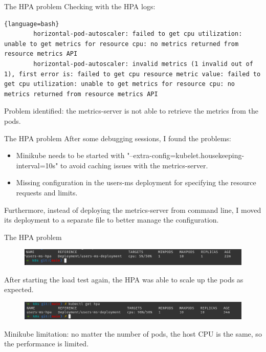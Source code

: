\documentclass{beamer}
\begin{document}
\begin{frame}[fragile]{The HPA problem}
Checking with the HPA logs:
	\begin{lstlisting}{language=bash}
		horizontal-pod-autoscaler: failed to get cpu utilization: unable to get metrics for resource cpu: no metrics returned from resource metrics API
		horizontal-pod-autoscaler: invalid metrics (1 invalid out of 1), first error is: failed to get cpu resource metric value: failed to get cpu utilization: unable to get metrics for resource cpu: no metrics returned from resource metrics API
	\end{lstlisting}

	\begin{block}{}
		Problem identified: the metrics-server is not able to retrieve the metrics from the pods.
	\end{block}
\end{frame}

\begin{frame}[fragile]{The HPA problem}
	After some debugging sessions, I found the problems:
	\begin{itemize}
		\item Minikube needs to be started with "--extra-config=kubelet.housekeeping-interval=10s" to avoid caching issues with the metrics-server.
		\item Missing configuration in the users-ms deployment for specifying the resource requests and limits.
	\end{itemize}

	Furthermore, instead of deploying the metrics-server from command line, I moved its deployment to a separate file to better manage the configuration.
\end{frame}

\begin{frame}[fragile]{The HPA problem}
	\begin{figure}
		\centering
		\includegraphics[width=1\linewidth]{./images/hpaFix1.png}
	\end{figure}
	After starting the load test again, the HPA was able to scale up the pods as expected.
	\begin{figure}
		\centering
		\includegraphics[width=1\linewidth]{./images/hpaFix3.png}
	\end{figure}
	Minikube limitation: no matter the number of pods, the host CPU is the same, so the performance is limited.
\end{frame}
	
\end{document}
